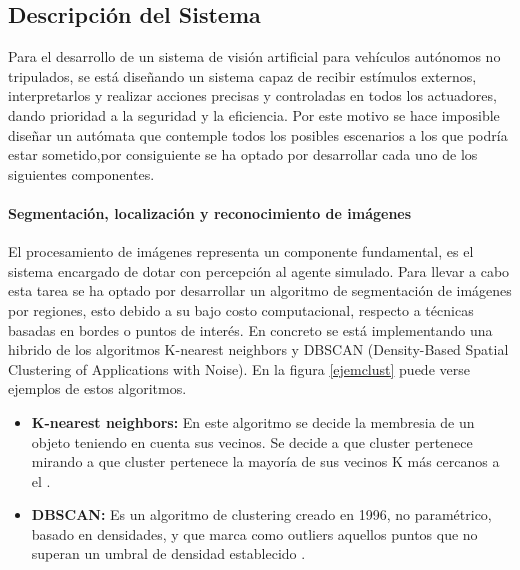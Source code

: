 \subsection{Descripción del Sistema}

Para el desarrollo de un sistema de visión artificial para vehículos autónomos no tripulados, se está diseñando un sistema capaz de recibir estímulos externos, interpretarlos y realizar acciones precisas y controladas en todos los actuadores, dando prioridad a la seguridad y la eficiencia. Por este motivo se hace imposible diseñar un autómata que contemple todos los posibles escenarios a los que podría estar sometido,por consiguiente se ha optado por desarrollar cada uno de los siguientes componentes.\\

\paragraph{Segmentación, localización y reconocimiento de imágenes}
El procesamiento de imágenes representa un componente fundamental, es el sistema encargado de dotar con percepción al agente simulado. Para llevar a cabo esta tarea se ha optado por desarrollar un algoritmo de segmentación de imágenes por regiones, esto debido a su bajo costo computacional, respecto a técnicas basadas en bordes o puntos de interés. En concreto se está implementando una hibrido de los algoritmos K-nearest neighbors y DBSCAN (Density-Based Spatial Clustering of Applications with Noise). En la figura \ref{ejemclust} puede verse ejemplos de estos algoritmos.\\

\begin{itemize}
	\item \textbf{K-nearest neighbors:} En este algoritmo se decide la membresia de un objeto teniendo en cuenta sus vecinos. Se decide a que cluster pertenece mirando a que cluster pertenece la mayoría de sus vecinos K más cercanos a el \cite{cluster}.\\
	
	\item \textbf{DBSCAN:} Es un algoritmo de clustering creado en 1996, no paramétrico, basado en densidades, y que marca como outliers aquellos puntos que no superan un umbral de densidad establecido \cite{cluster2}.\\
\end{itemize}

